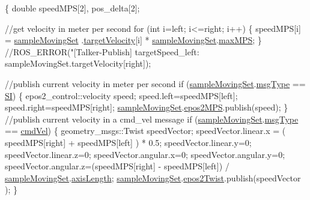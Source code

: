 \begin{DoxyCode}
\{
    \textcolor{keywordtype}{double} speedMPS[2], pos\_delta[2];

        \textcolor{comment}{//get velocity in meter per second}
    \textcolor{keywordflow}{for} (\textcolor{keywordtype}{int} i=left; i<=right; i++) \{ speedMPS[i] = \hyperlink{classSampleMoving_af9c7dc0be1c4197469fbfa7aa105f1cc}{sampleMovingSet}
      .\hyperlink{structSampleMoving_1_1sampleMovingSettingStruct_a1fd52fce6a806d0ee764867ab142b255}{targetVelocity}[i] * \hyperlink{classSampleMoving_af9c7dc0be1c4197469fbfa7aa105f1cc}{sampleMovingSet}.\hyperlink{structSampleMoving_1_1sampleMovingSettingStruct_a293fb79eebdf2c0f45aa196070391c82}{maxMPS}; 
      \}
    \textcolor{comment}{//ROS\_ERROR("[Talker-Publish] targetSpeed\_left: %
       sampleMovingSet.targetVelocity[right]);}

        \textcolor{comment}{//publish current velocity in meter per second}
    \textcolor{keywordflow}{if} (\hyperlink{classSampleMoving_af9c7dc0be1c4197469fbfa7aa105f1cc}{sampleMovingSet}.\hyperlink{structSampleMoving_1_1sampleMovingSettingStruct_af9c784abc287cfcfc6df641c99b52c47}{msgType} == \hyperlink{classSampleMoving_a68852e46a4c2887978990a7dd92bc66ea4875b4f467dbf540a6bf9f93b182fcd2}{SI}) \{
        epos2\_control::velocity speed;
        speed.left=speedMPS[left];
        speed.right=speedMPS[right];
        \hyperlink{classSampleMoving_af9c7dc0be1c4197469fbfa7aa105f1cc}{sampleMovingSet}.\hyperlink{structSampleMoving_1_1sampleMovingSettingStruct_a5e6f9645c99c0b227827d8f69e0eaa3f}{epos2MPS}.publish(speed);
    \}
        \textcolor{comment}{//publish current velocity in a cmd\_vel message}
    \textcolor{keywordflow}{if} (\hyperlink{classSampleMoving_af9c7dc0be1c4197469fbfa7aa105f1cc}{sampleMovingSet}.\hyperlink{structSampleMoving_1_1sampleMovingSettingStruct_af9c784abc287cfcfc6df641c99b52c47}{msgType} == \hyperlink{classSampleMoving_a68852e46a4c2887978990a7dd92bc66ea06732e1094ab62068d0edca312788d5c}{cmdVel}) \{
        geometry\_msgs::Twist speedVector;
        speedVector.linear.x = ( speedMPS[right] + speedMPS[left] ) * 0.5;
        speedVector.linear.y=0;
        speedVector.linear.z=0;
        speedVector.angular.x=0;
        speedVector.angular.y=0;
        speedVector.angular.z=(speedMPS[right] - speedMPS[left]) / 
      \hyperlink{classSampleMoving_af9c7dc0be1c4197469fbfa7aa105f1cc}{sampleMovingSet}.\hyperlink{structSampleMoving_1_1sampleMovingSettingStruct_a72168d31106a7f5e12c2eb303a487515}{axisLength};
        \hyperlink{classSampleMoving_af9c7dc0be1c4197469fbfa7aa105f1cc}{sampleMovingSet}.\hyperlink{structSampleMoving_1_1sampleMovingSettingStruct_a5029964881beda76675cce0dd7a3d21f}{epos2Twist}.publish(speedVector
      );
    \}


\end{DoxyCode}
